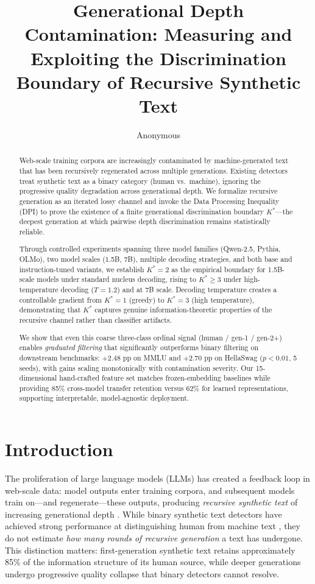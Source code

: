 \documentclass[11pt,a4paper]{article}
\title{Generational Depth Contamination: Measuring and Exploiting the Discrimination Boundary of Recursive Synthetic Text}
\author{Anonymous}
\begin{document}
\maketitle

\begin{abstract}
Web-scale training corpora are increasingly contaminated by machine-generated text that has been recursively regenerated across multiple generations.
Existing detectors treat synthetic text as a binary category (human vs.\ machine), ignoring the progressive quality degradation across generational depth.
We formalize recursive generation as an iterated lossy channel and invoke the Data Processing Inequality (DPI) to prove the existence of a finite generational discrimination boundary $K^*$---the deepest generation at which pairwise depth discrimination remains statistically reliable.

Through controlled experiments spanning three model families (Qwen-2.5, Pythia, OLMo), two model scales (1.5B, 7B), multiple decoding strategies, and both base and instruction-tuned variants, we establish $K^*=2$ as the empirical boundary for 1.5B-scale models under standard nucleus decoding, rising to $K^*\geq 3$ under high-temperature decoding ($T=1.2$) and at 7B scale.
Decoding temperature creates a controllable gradient from $K^*=1$ (greedy) to $K^*=3$ (high temperature), demonstrating that $K^*$ captures genuine information-theoretic properties of the recursive channel rather than classifier artifacts.

We show that even this coarse three-class ordinal signal (human / gen-1 / gen-2+) enables \emph{graduated filtering} that significantly outperforms binary filtering on downstream benchmarks: $+2.48$ pp on MMLU and $+2.70$ pp on HellaSwag ($p<0.01$, 5 seeds), with gains scaling monotonically with contamination severity.
Our 15-dimensional hand-crafted feature set matches frozen-embedding baselines while providing 85\% cross-model transfer retention versus 62\% for learned representations, supporting interpretable, model-agnostic deployment.
\end{abstract}

\section{Introduction}

The proliferation of large language models (LLMs) has created a feedback loop in web-scale data: model outputs enter training corpora, and subsequent models train on---and regenerate---these outputs, producing \emph{recursive synthetic text} of increasing generational depth \cite{shumailov2024model}.
While binary synthetic text detectors have achieved strong performance at distinguishing human from machine text \cite{mitchell2023detectgpt,hans2024binoculars}, they do not estimate \emph{how many rounds of recursive generation} a text has undergone.
This distinction matters: first-generation synthetic text retains approximately 85\% of the information structure of its human source, while deeper generations undergo progressive quality collapse that binary detectors cannot resolve.
\end{document}
